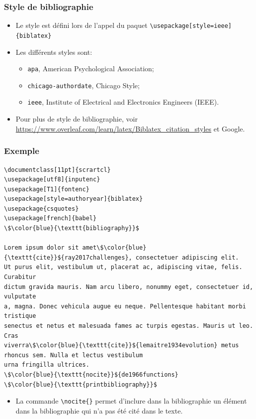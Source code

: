 \begin{frame}[fragile]
  \frametitle{Style de bibliographie}
  \begin{itemize}
      \item Le style est défini lors de l'appel du paquet \lstinline|\usepackage[style=ieee]{biblatex}|
      \item Les différents styles sont:
      \begin{itemize}
          \item \texttt{apa}, American Psychological Association;
          \item \texttt{chicago-authordate}, Chicago Style;
          \item \texttt{ieee}, Institute of Electrical and Electronics Engineers (IEEE).
      \end{itemize}
      \item Pour plus de style de bibliographie, voir \url{https://www.overleaf.com/learn/latex/Biblatex_citation_styles} et Google.
  \end{itemize}
\end{frame}

\begin{frame}[fragile]
  \frametitle{Exemple}
  \begin{lstlisting}[style=nonumbers,mathescape]
\documentclass[11pt]{scrartcl}
\usepackage[utf8]{inputenc}
\usepackage[T1]{fontenc}
\usepackage[style=authoryear]{biblatex}
\usepackage{csquotes}
\usepackage[french]{babel}
\$\color{blue}{\texttt{bibliography}}$

Lorem ipsum dolor sit amet\$\color{blue}{\texttt{cite}}${ray2017challenges}, consectetuer adipiscing elit.
Ut purus elit, vestibulum ut, placerat ac, adipiscing vitae, felis. Curabitur
dictum gravida mauris. Nam arcu libero, nonummy eget, consectetuer id, vulputate
a, magna. Donec vehicula augue eu neque. Pellentesque habitant morbi tristique
senectus et netus et malesuada fames ac turpis egestas. Mauris ut leo. Cras
viverra\$\color{blue}{\texttt{cite}}${lemaitre1934evolution} metus rhoncus sem. Nulla et lectus vestibulum
urna fringilla ultrices.
\$\color{blue}{\texttt{nocite}}${de1966functions}
\$\color{blue}{\texttt{printbibliography}}$

  \end{lstlisting}
  \begin{itemize}
      \item La commande \lstinline|\nocite{}| permet d'inclure dans la bibliographie un élément dans la bibliographie qui n'a pas été cité dans le texte.
  \end{itemize}
\end{frame}

